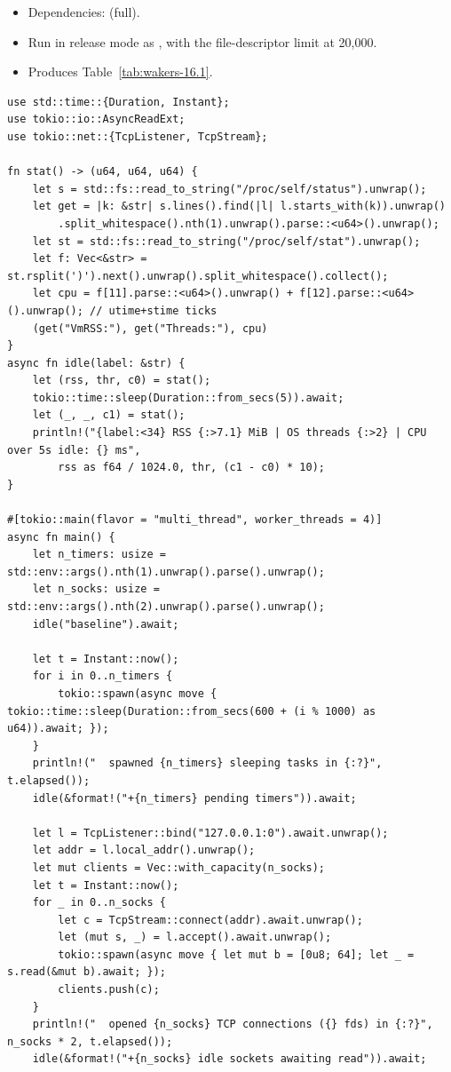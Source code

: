 \begin{itemize}
    \item Dependencies:  (full).
    \item Run in release mode as , with the file-descriptor limit at 20,000.
    \item Produces Table~\ref{tab:wakers-16.1}.
\end{itemize}

\begin{lstlisting}[caption={Idle cost and wake-up latency with 100,000 timers and 9,000 sockets.}, label=lst:wakers-A.4]
use std::time::{Duration, Instant};
use tokio::io::AsyncReadExt;
use tokio::net::{TcpListener, TcpStream};

fn stat() -> (u64, u64, u64) {
    let s = std::fs::read_to_string("/proc/self/status").unwrap();
    let get = |k: &str| s.lines().find(|l| l.starts_with(k)).unwrap()
        .split_whitespace().nth(1).unwrap().parse::<u64>().unwrap();
    let st = std::fs::read_to_string("/proc/self/stat").unwrap();
    let f: Vec<&str> = st.rsplit(')').next().unwrap().split_whitespace().collect();
    let cpu = f[11].parse::<u64>().unwrap() + f[12].parse::<u64>().unwrap(); // utime+stime ticks
    (get("VmRSS:"), get("Threads:"), cpu)
}
async fn idle(label: &str) {
    let (rss, thr, c0) = stat();
    tokio::time::sleep(Duration::from_secs(5)).await;
    let (_, _, c1) = stat();
    println!("{label:<34} RSS {:>7.1} MiB | OS threads {:>2} | CPU over 5s idle: {} ms",
        rss as f64 / 1024.0, thr, (c1 - c0) * 10);
}

#[tokio::main(flavor = "multi_thread", worker_threads = 4)]
async fn main() {
    let n_timers: usize = std::env::args().nth(1).unwrap().parse().unwrap();
    let n_socks: usize = std::env::args().nth(2).unwrap().parse().unwrap();
    idle("baseline").await;

    let t = Instant::now();
    for i in 0..n_timers {
        tokio::spawn(async move { tokio::time::sleep(Duration::from_secs(600 + (i % 1000) as u64)).await; });
    }
    println!("  spawned {n_timers} sleeping tasks in {:?}", t.elapsed());
    idle(&format!("+{n_timers} pending timers")).await;

    let l = TcpListener::bind("127.0.0.1:0").await.unwrap();
    let addr = l.local_addr().unwrap();
    let mut clients = Vec::with_capacity(n_socks);
    let t = Instant::now();
    for _ in 0..n_socks {
        let c = TcpStream::connect(addr).await.unwrap();
        let (mut s, _) = l.accept().await.unwrap();
        tokio::spawn(async move { let mut b = [0u8; 64]; let _ = s.read(&mut b).await; });
        clients.push(c);
    }
    println!("  opened {n_socks} TCP connections ({} fds) in {:?}", n_socks * 2, t.elapsed());
    idle(&format!("+{n_socks} idle sockets awaiting read")).await;


\end{lstlisting}
